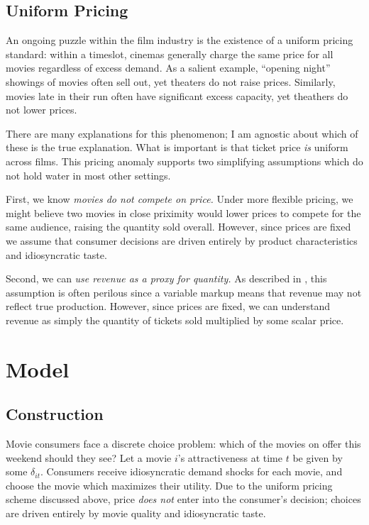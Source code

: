 \documentclass{article}
\begin{document}
\subsection{Uniform Pricing}

An ongoing puzzle within the film industry is the existence of a uniform pricing standard: within a timeslot, cinemas generally charge the same price for all movies regardless of excess demand. As a salient example, ``opening night'' showings of movies often sell out, yet theaters do not raise prices. Similarly, movies late in their run often have significant excess capacity, yet theathers do not lower prices.

There are many explanations for this phenomenon; I am agnostic about which of these is the true explanation. What is important is that ticket price \emph{is} uniform across films. This pricing anomaly supports two simplifying assumptions which do not hold water in most other settings.

First, we know \emph{movies do not compete on price.} Under more flexible pricing, we might believe two movies in close priximity would lower prices to compete for the same audience, raising the quantity sold overall. However, since prices are fixed we assume that consumer decisions are driven entirely by product characteristics and idiosyncratic taste.

Second, we can \emph{use revenue as a proxy for quantity.} As described in \textcite{bond2021JME}, this assumption is often perilous since a variable markup means that revenue may not reflect true production. However, since prices are fixed, we can understand revenue as simply the quantity of tickets sold multiplied by some scalar price. 


\section{Model}

\subsection{Construction}

Movie consumers face a discrete choice problem: which of the movies on offer this weekend should they see? Let a movie $i$'s attractiveness at time $t$ be given by some $\delta_{it}$. Consumers receive idiosyncratic demand shocks for each movie, and choose the movie which maximizes their utility. Due to the uniform pricing scheme discussed above, price \emph{does not} enter into the consumer's decision; choices are driven entirely by movie quality and idiosyncratic taste.
\end{document}
